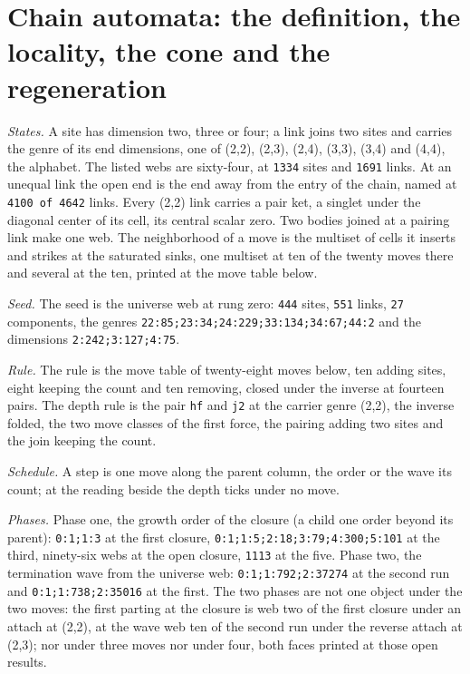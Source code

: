 \section{Chain automata: the definition, the locality, the cone and the regeneration}\label{mod:X-12-chain-automata-the-definition-the-locality-the-cone-and-the-regeneration}
\begin{chdefinition}\scriptsize
\scriptsize
\textit{States.} A site has dimension two, three or four; a link joins two sites and carries the genre of its end dimensions, one of (2,2), (2,3), (2,4), (3,3), (3,4) and (4,4), the alphabet. The listed webs are sixty-four, at \texttt{1334} sites and \texttt{1691} links. At an unequal link the open end is the end away from the entry of the chain, named at \texttt{4100 of 4642} links. Every (2,2) link carries a pair ket, a singlet under the diagonal center of its cell, its central scalar zero. Two bodies joined at a pairing link make one web. The neighborhood of a move is the multiset of cells it inserts and strikes at the saturated sinks, one multiset at ten of the twenty moves there and several at the ten, printed at the move table below.

\textit{Seed.} The seed is the universe web at rung zero: \texttt{444} sites, \texttt{551} links, \texttt{27} components, the genres \texttt{22:85;23:34;24:229;33:134;34:67;44:2} and the dimensions \texttt{2:242;3:127;4:75}.

\textit{Rule.} The rule is the move table of twenty-eight moves below, ten adding sites, eight keeping the count and ten removing, closed under the inverse at fourteen pairs. The depth rule is the pair \texttt{hf} and \texttt{j2} at the carrier genre (2,2), the inverse folded, the two move classes of the first force, the pairing adding two sites and the join keeping the count.

\textit{Schedule.} A step is one move along the parent column, the order or the wave its count; at the reading beside the depth ticks under no move.

\textit{Phases.} Phase one, the growth order of the closure (a child one order beyond its parent): \texttt{0:1;1:3} at the first closure, \texttt{0:1;1:5;2:18;3:79;4:300;5:101} at the third, ninety-six webs at the open closure, \texttt{1113} at the five. Phase two, the termination wave from the universe web: \texttt{0:1;1:792;2:37274} at the second run and \texttt{0:1;1:738;2:35016} at the first. The two phases are not one object under the two moves: the first parting at the closure is web two of the first closure under an attach at (2,2), at the wave web ten of the second run under the reverse attach at (2,3); nor under three moves nor under four, both faces printed at those open results.


\end{chdefinition}
